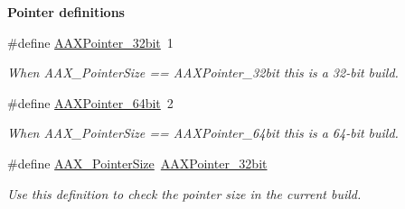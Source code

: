 \begin{Indent}{\bf Pointer definitions}\par
\begin{DoxyCompactItemize}
\item 
\#define \hyperlink{a00149_a3310096b753437bda7ec67de445cf9cb}{A\+A\+X\+Pointer\+\_\+32bit}~1
\begin{DoxyCompactList}\small\item\em When A\+A\+X\+\_\+\+Pointer\+Size == A\+A\+X\+Pointer\+\_\+32bit this is a 32-\/bit build. \end{DoxyCompactList}\item 
\#define \hyperlink{a00149_a1a53e919284726babb582d3bb105b08b}{A\+A\+X\+Pointer\+\_\+64bit}~2
\begin{DoxyCompactList}\small\item\em When A\+A\+X\+\_\+\+Pointer\+Size == A\+A\+X\+Pointer\+\_\+64bit this is a 64-\/bit build. \end{DoxyCompactList}\item 
\#define \hyperlink{a00149_a078a28903a34f1bd25f1e23d65df6212}{A\+A\+X\+\_\+\+Pointer\+Size}~\hyperlink{a00149_a3310096b753437bda7ec67de445cf9cb}{A\+A\+X\+Pointer\+\_\+32bit}
\begin{DoxyCompactList}\small\item\em Use this definition to check the pointer size in the current build. \end{DoxyCompactList}\end{DoxyCompactItemize}
\end{Indent}
